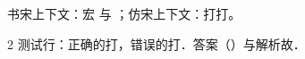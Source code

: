\documentclass[fontset=none]{ctexart}
\begin{document}
书宋上下文：宏 \gou{} 与 \cha{}；仿宋上下文：{\fangsong 打\gou{}打\cha{}}。

\begin{multicols}{2}
测试行：正确的打\gou{}，错误的打\cha{}．答案（\makebox[1.8em]{\cha{}}）与解析故\cha{}．
\end{multicols}
\end{document}
